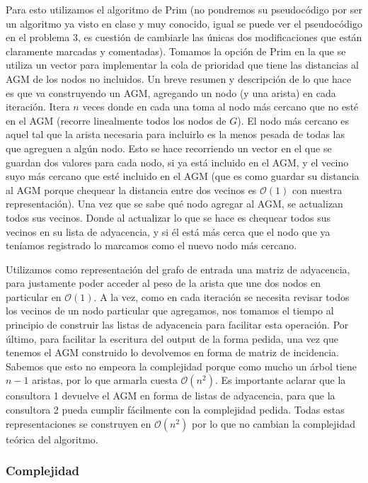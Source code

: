 \documentclass[A4paper,oneside,fleqn,11pt]{article}
\theoremstyle{definition}
\begin{document}
Para esto utilizamos el algoritmo de Prim (no pondremos su pseudocódigo por ser un algoritmo ya visto en clase y muy conocido, igual se puede ver el pseudocódigo en el problema 3, es cuestión de cambiarle las únicas dos modificaciones que están claramente marcadas y comentadas). Tomamos la opción de Prim en la que se utiliza un vector para implementar la cola de prioridad que tiene las distancias al AGM de los nodos no incluidos. Un breve resumen y descripción de lo que hace es que va construyendo un AGM, agregando un nodo (y una arista) en cada iteración. Itera $n$ veces donde en cada una toma al nodo más cercano que no esté en el AGM (recorre linealmente todos los nodos de $G$). El nodo más cercano es aquel tal que la arista necesaria para incluirlo es la menos pesada de todas las que agreguen a algún nodo. Esto se hace recorriendo un vector en el que se guardan dos valores para cada nodo, si ya está incluido en el AGM, y el vecino suyo más cercano que esté incluido en el AGM (que es como guardar su distancia al AGM porque chequear la distancia entre dos vecinos es $\mathcal{O} (1)$ con nuestra representación). Una vez que se sabe qué nodo agregar al AGM, se actualizan todos sus vecinos. Donde al actualizar lo que se hace es chequear todos sus vecinos en su lista de adyacencia, y si él está más cerca que el nodo que ya teníamos registrado lo marcamos como el nuevo nodo más cercano.

Utilizamos como representación del grafo de entrada una matriz de adyacencia, para justamente poder acceder al peso de la arista que une dos nodos en particular en $\mathcal{O} (1)$. A la vez, como en cada iteración se necesita revisar todos los vecinos de un nodo particular que agregamos, nos tomamos el tiempo al principio de construir las listas de adyacencia para facilitar esta operación. Por último, para facilitar la escritura del output de la forma pedida, una vez que tenemos el AGM construido lo devolvemos en forma de matriz de incidencia. Sabemos que esto no empeora la complejidad porque como mucho un árbol tiene $n-1$ aristas, por lo que armarla cuesta $\mathcal{O}(n^2)$. Es importante aclarar que la consultora 1 devuelve el AGM en forma de listas de adyacencia, para que la consultora 2 pueda cumplir fácilmente con la complejidad pedida. Todas estas representaciones se construyen en $\mathcal{O}(n^2)$ por lo que no cambian la complejidad teórica del algoritmo.


\subsubsection{Complejidad}
\end{document}
